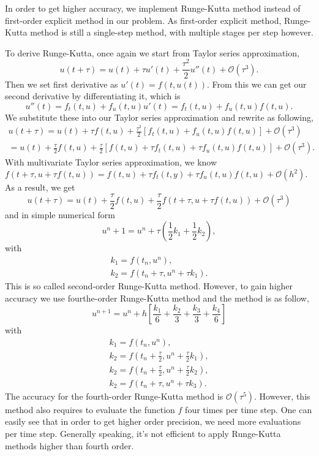\documentclass[10pt,a4paper]{report}
\begin{document}
In order to get higher accuracy, we implement Runge-Kutta method instead of first-order explicit method in our problem. As first-order explicit method, Runge-Kutta method is still a single-step method, with multiple stages per step however. 

To derive Runge-Kutta, once again we start from Taylor series approximation, \[u(t+\tau)=u(t)+\tau u'(t)+{\frac{\tau^2}{2}}u''(t)+\mathcal{O}(\tau^3).\]
Then we set first derivative as $u'(t)=f(t,u(t))$. From this we can get our second derivative by differentiating it, which is \[u''(t)=f_t(t,u)+f_u(t,u)u'(t)=f_t(t,u)+f_u(t,u)f(t,u).\] We substitute these into our Taylor series approximation and rewrite as following,
\begin{align*} %
u(t+\tau)
=u(t)+\tau f(t,u)+{\frac{\tau^2}{2}}[f_t(t,u)+f_u(t,u)f(t,u)]+\mathcal{O}(\tau^3)\\
=u(t)+{\frac{\tau}{2}} f(t,u)+{\frac{\tau}{2}}[f(t,u)+\tau f_t(t,u)+\tau f_u(t,u)f(t,u)]+\mathcal{O}(\tau^3).  
\end{align*}
With multivariate Taylor series approximation, we know $f(t+\tau,u+\tau f(t,u))=f(t,u)+\tau f_t(t,y)+\tau f_u(t,u)f(t,u)+\mathcal{O}(h^2).$ As a result, we get \[u(t+\tau)=u(t)+{\frac{\tau}{2}}f(t,u)+{\frac{\tau}{2}}f(t+\tau,u+\tau f(t,u))+\mathcal{O}(\tau^3)\] and in simple numerical form \[u^n+1=u^n+\tau ({\frac{1}{2}}k_1+{\frac{1}{2}}k_2),\]with 
\begin{align*}
k_1=f(t_n,u^n),\\
k_2 = f(t_n+\tau, u^n+\tau k_1).
\end{align*}
This is so called second-order Runge-Kutta method. However, to gain higher accuracy we use fourthe-order Runge-Kutta method and the method is as follow,\[u^{n+1}=u^n+h[{\frac{k_1}{6}}+{\frac{k_2}{3}}+{\frac{k_3}{3}}+{\frac{k_4}{6}}]\]
with
\begin{align*}
k_1=f(t_n,u^n),\\
k_2=f(t_n+{\frac{\tau}{2}},u^n+{\frac{\tau}{2}}k_1),\\
k_2=f(t_n+{\frac{\tau}{2}},u^n+{\frac{\tau}{2}}k_2),\\
k_2=f(t_n+\tau,u^n+\tau k_3).
\end{align*}
The accuracy for the fourth-order Runge-Kutta method is $\mathcal{O}(\tau^5)$. However, this method also requires to evaluate the function $f$ four times per time step. One can easily see that in order to get higher order precision, we need more evaluations per time step. Generally speaking, it's not efficient to apply Runge-Kutta methods higher than fourth order. 
\end{document}

